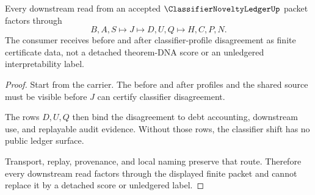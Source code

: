 \begin{theorem}
\label{thm:classifier-novelty-ledger-handoff}
Every downstream read from an accepted $\ClassifierNoveltyLedgerUp$ packet factors through
$$
B,A,S \longmapsto J \longmapsto D,U,Q \longmapsto H,C,P,N .
$$
The consumer receives before and after classifier-profile disagreement as finite certificate data, not a detached theorem-DNA score or an unledgered interpretability label.
\end{theorem}
\begin{proof}
Start from the carrier. The before and after profiles and the shared source must be visible before $J$ can certify classifier disagreement.

The rows $D,U,Q$ then bind the disagreement to debt accounting, downstream use, and replayable audit evidence. Without those rows, the classifier shift has no public ledger surface.

Transport, replay, provenance, and local naming preserve that route. Therefore every downstream read factors through the displayed finite packet and cannot replace it by a detached score or unledgered label.
\end{proof}




